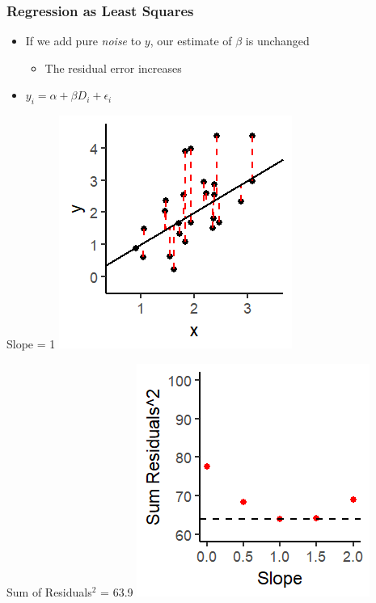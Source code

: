\documentclass[xcolor=x11names,compress]{beamer}\usepackage[]{graphicx}\usepackage[]{color}
\makeatletter
\def\maxwidth{ %
  \ifdim\Gin@nat@width>\linewidth
    \linewidth
  \else
    \Gin@nat@width
  \fi
}
\newenvironment{knitrout}{}{} %
\renewcommand{\(}{\begin{columns}}
\renewcommand{\)}{\end{columns}}
\newcommand{\<}[1]{\begin{column}{#1}}
\renewcommand{\>}{\end{column}}
\makeatother
\begin{document}
\begin{frame}
\frametitle{Regression as Least Squares}
\begin{itemize}
\item If we add pure \textit{noise} to $y$, our estimate of $\beta$ is unchanged
\begin{itemize}
\item The residual error increases
\end{itemize}
\item $y_i = \alpha + \beta D_i + \epsilon_i$
\end{itemize}
\begin{multicols}{2}
Slope = 1
\begin{knitrout}
\color{fgcolor}
\includegraphics[width=\maxwidth]{figure/graph_ols7-1} 

\end{knitrout}
\columnbreak
Sum of Residuals$^2$ = 63.9
\begin{knitrout}
\color{fgcolor}
\includegraphics[width=\maxwidth]{figure/graph_ssr7-1} 

\end{knitrout}
\end{multicols}
\end{frame}
\end{document}
